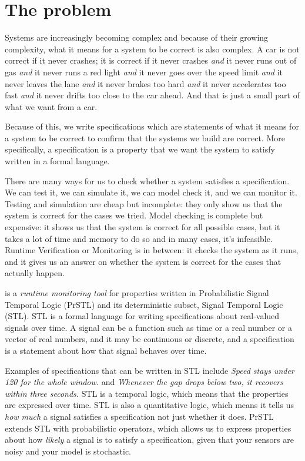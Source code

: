\chapter{The problem}

Systems are increasingly becoming complex and because of their growing complexity, what it means for a system to be correct is also complex. A car is not correct if it never crashes; it is correct if it never crashes \emph{and} it never runs out of gas \emph{and} it never runs a red light \emph{and} it never goes over the speed limit \emph{and} it never leaves the lane \emph{and} it never brakes too hard \emph{and} it never accelerates too fast \emph{and} it never drifts too close to the car ahead. And that is just a small part of what we want from a car. 

Because of this, we write specifications which are statements of what it means for a system to be correct to confirm that the systems we build are correct. More specifically, a specification is a property that we want the system to satisfy written in a formal language.

There are many ways for us to check whether a system satisfies a specification. We can test it, we can simulate it, we can model check it, and we can monitor it. Testing and simulation are cheap but incomplete: they only show us that the system is correct for the cases we tried. Model checking is complete but expensive: it shows us that the system is correct for all possible cases, but it takes a lot of time and memory to do so and in many cases, it's infeasible. Runtime Verification or Monitoring is in between: it checks the system as it runs, and it gives us an answer on whether the system is correct for the cases that actually happen.

\sentil{} is a \emph{runtime monitoring tool} for properties written in Probabilistic Signal Temporal Logic (PrSTL) and its deterministic subset, Signal Temporal Logic (STL). STL is a formal language for writing specifications about real-valued signals over time. A signal can be a function such as time or a real number or a vector of real numbers, and it may be continuous or discrete, and a specification is a statement about how that signal behaves over time. 

Examples of specifications that can be written in STL include \emph{Speed stays under 120 for the whole window.} and \emph{Whenever the gap drops below two, it recovers within three seconds.} STL is a temporal logic, which means that the properties are expressed over time. STL is also a quantitative logic, which means it tells us \emph{how much} a signal satisfies a specification not just whether it does. PrSTL extends STL with probabilistic operators, which allows us to express properties about how \emph{likely} a signal is to satisfy a specification, given that your sensors are noisy and your model is stochastic.

